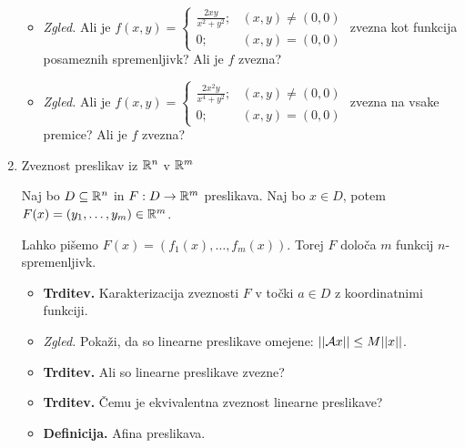\begin{enumerate}
\begin{itemize}
        \item \colorbox{yellow!30}{\emph{Zgled.}} Ali je $f(x, y) = \begin{cases}
            \frac{2xy}{x^2+y^2}; &(x, y) \neq (0,0) \\ 0; &(x, y) = (0,0)
        \end{cases}$ zvezna kot funkcija posameznih spremenljivk? Ali je $f$ zvezna?
        \item \colorbox{yellow!30}{\emph{Zgled.}} Ali je $f(x, y) = \begin{cases}
            \frac{2x^2y}{x^4+y^2}; &(x, y) \neq (0,0) \\ 0; &(x, y) = (0,0)
        \end{cases}$ zvezna na vsake premice? Ali je $f$ zvezna?
    \end{itemize}

    \item Zveznost preslikav iz $\mathbb{R}^n$ v $\mathbb{R}^m$
    
    Naj bo $D \subseteq \mathbb{R}^n$ in $F: D \to \mathbb{R}^m$ preslikava. Naj bo $x \in D$, potem $F(x) = (y_1, \ldots, y_m) \in \mathbb{R}^m$.

    Lahko pišemo $F(x) = (f_1(x), \ldots, f_m(x))$. Torej $F$ določa $m$ funkcij $n$-spremenljivk.
    \begin{itemize}
        \item \colorbox{blue!30}{\textbf{Trditev.}} Karakterizacija zveznosti $F$ v točki $a \in D$ z koordinatnimi funkciji.
        \item \colorbox{yellow!30}{\emph{Zgled.}} Pokaži, da so linearne preslikave omejene: $||\mathcal{A}x|| \leq M ||x||$.
        \item \colorbox{blue!30}{\textbf{Trditev.}} Ali so linearne preslikave zvezne?
        \item \colorbox{blue!30}{\textbf{Trditev.}} Čemu je ekvivalentna zveznost linearne preslikave?
        \item \colorbox{purple!30}{\textbf{Definicija.}} Afina preslikava.
    \end{itemize}
\end{enumerate}

\newpage
